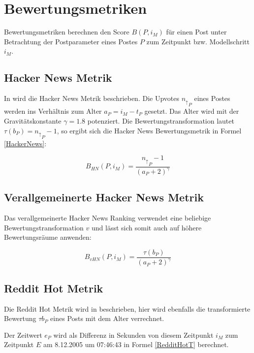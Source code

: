 \section{Bewertungsmetriken}

Bewertungsmetriken berechnen den Score $B(P,i_M)$ für einen Post unter Betrachtung der Postparameter eines Postes $P$ zum Zeitpunkt bzw. Modellschritt $i_M$.
	
\subsection{Hacker News Metrik}
\label{seqHackerNews}

In \cite{SalihefendicHN} wird die Hacker News Metrik beschrieben. Die Upvotes ${n_\uparrow}_{P}$ eines Postes werden ins Verhältnis zum Alter $a_{P} = i_M - t_P$ gesetzt. Das Alter wird mit der Gravitätskonstante $\gamma = 1.8$ potenziert. Die Bewertungstransformation lautet $\tau(b_P) = {n_{\uparrow}}_P - 1$, so ergibt sich die Hacker News Bewertungsmetrik in Formel \ref{HackerNews}:
 
\begin{equation}
\label{HackerNews}
B_{HN}(P,i_M) = \frac{{n_\uparrow}_P - 1}{(a_P + 2)^{\gamma}}
\end{equation}

\subsection{Verallgemeinerte Hacker News Metrik}
\label{seqvHackerNews}
Das verallgemeinerte Hacker News Ranking verwendet eine beliebige Bewertungstransformation $v$ und lässt sich somit auch auf höhere Bewertungsräume anwenden:

\begin{equation}
\label{vHackerNews}
B_{vHN}(P,i_M) = \frac{\tau(b_P)}{(a_P + 2)^{\gamma}}
\end{equation}


\subsection{Reddit Hot Metrik}

Die Reddit Hot Metrik wird in \cite{SalihefendicR} beschrieben, hier wird ebenfalls die transformierte Bewertung $\tau{b_P}$ eines Posts mit dem Alter verrechnet.

Der Zeitwert $e_P$ wird als Differenz in Sekunden von diesem Zeitpunkt $i_M$ zum Zeitpunkt $E$ am 8.12.2005 um 07:46:43 in Formel \ref{RedditHotT} berechnet.

